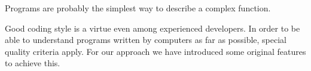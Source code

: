 Programs are probably the simplest way to describe a complex function.

Good coding style is a virtue even among experienced developers. In order to be able to understand programs written by computers as far as possible, special quality criteria apply. For our approach we have introduced some original features to achieve this.
